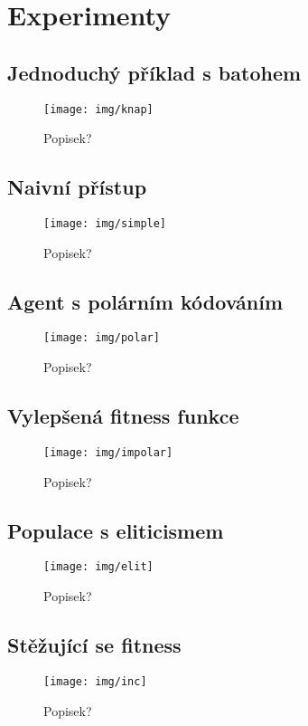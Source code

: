 \chapter{Experimenty}

\section{Jednoduchý příklad s batohem}
\begin{figure}[p]\centering
\texttt{[image: img/knap]}
\caption{Popisek?}
\label{exp:1}

\end{figure}


\section{Naivní přístup}
\begin{figure}[p]\centering
\texttt{[image: img/simple]}
\caption{Popisek?}
\label{exp:2}
\end{figure}


\section{Agent s polárním kódováním}
\begin{figure}[p]\centering
\texttt{[image: img/polar]}
\caption{Popisek?}
\label{exp:3}
\end{figure}


\section{Vylepšená fitness funkce}
\begin{figure}[p]\centering
\texttt{[image: img/impolar]}
\caption{Popisek?}
\label{exp:4}
\end{figure}


\section{Populace s eliticismem}
\begin{figure}[p]\centering
\texttt{[image: img/elit]}
\caption{Popisek?}
\label{exp:5}
\end{figure}


\section{Stěžující se fitness}
\begin{figure}[p]\centering
\texttt{[image: img/inc]}
\caption{Popisek?}
\label{exp:6}
\end{figure}
